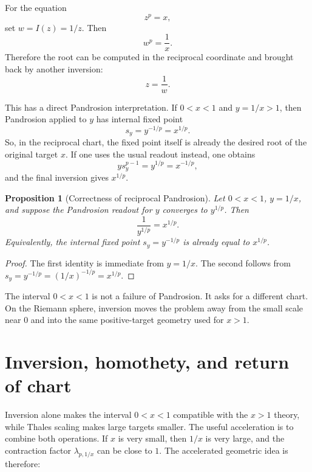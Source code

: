 \documentclass[10pt,a4paper]{article}
\theoremstyle{plain}
\newtheorem{proposition}[theorem]{Proposition}
\theoremstyle{definition}
\theoremstyle{remark}
\newenvironment{takeaway}{%
  \begin{center}\begin{minipage}{0.92\linewidth}\small\itshape\color{blue!45!black}%
}{%
  \end{minipage}\end{center}%
}
\begin{document}
For the equation
\[
  z^p=x,
\]
set $w=I(z)=1/z$.  Then
\begin{equation}
  w^p=\frac{1}{x}.
  \label{eq:inverted-root-equation}
\end{equation}
Therefore the root can be computed in the reciprocal coordinate and brought
back by another inversion:
\[
  z=\frac{1}{w}.
\]

This has a direct Pandrosion interpretation.  If $0<x<1$ and $y=1/x>1$, then
Pandrosion applied to $y$ has internal fixed point
\[
  s_y=y^{-1/p}=x^{1/p}.
\]
So, in the reciprocal chart, the fixed point itself is already the desired root
of the original target $x$.  If one uses the usual readout instead, one obtains
\[
  y s_y^{p-1}=y^{1/p}=x^{-1/p},
\]
and the final inversion gives $x^{1/p}$.

\begin{proposition}[Correctness of reciprocal Pandrosion]
Let $0<x<1$, $y=1/x$, and suppose the Pandrosion readout for $y$ converges to
$y^{1/p}$.  Then
\[
  \frac{1}{y^{1/p}}=x^{1/p}.
\]
Equivalently, the internal fixed point $s_y=y^{-1/p}$ is already equal to
$x^{1/p}$.
\end{proposition}

\begin{proof}
The first identity is immediate from $y=1/x$.  The second follows from
$s_y=y^{-1/p}=(1/x)^{-1/p}=x^{1/p}$.
\end{proof}

\begin{takeaway}
The interval $0<x<1$ is not a failure of Pandrosion.  It asks for a different
chart.  On the Riemann sphere, inversion moves the problem away from the small
scale near $0$ and into the same positive-target geometry used for $x>1$.
\end{takeaway}

\section{Inversion, homothety, and return of chart}
\label{sec:riemann-chart-scaling}

Inversion alone makes the interval $0<x<1$ compatible with the $x>1$ theory,
while Thales scaling makes large targets smaller.  The useful acceleration is to
combine both operations.  If $x$ is very small, then $1/x$ is very large, and the
contraction factor
$\lambda_{p,1/x}$ can be close to $1$.  The accelerated geometric idea is
therefore:
\end{document}

